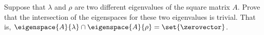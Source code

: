 Suppose that $\lambda$ and $\rho$ are two different eigenvalues of the square matrix $A$.   Prove that the intersection of the eigenspaces for these two eigenvalues is trivial.  That is, $\eigenspace{A}{\lambda}\cap\eigenspace{A}{\rho}=\set{\zerovector}$.